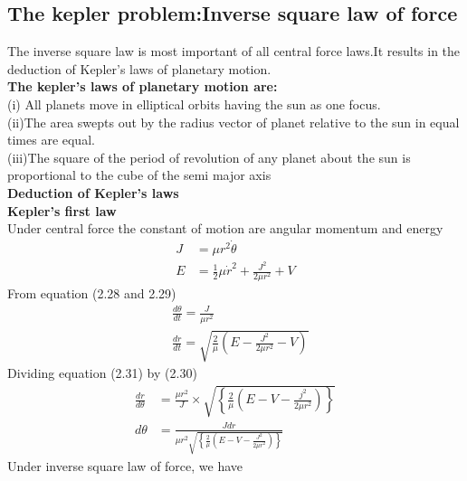 \subsection{The kepler problem:Inverse square law of force}
The inverse square law is most important of all central force laws.It results in the deduction of Kepler's laws of planetary motion.\\
\textbf{The kepler's laws of planetary motion are:}\\
(i) All planets move in elliptical orbits having the sun as one focus.\\
(ii)The area swepts out by the radius vector of planet relative to the sun in equal times are equal.\\
(iii)The square of the period of revolution of any planet about the sun is proportional to the cube of the semi major axis\\
\textbf{Deduction of Kepler's laws}\\
\textbf{Kepler's first law}\\
Under central force the constant of motion are angular momentum and energy
\begin{align}
J&=\mu r^{2} \dot{\theta} \\
 E&=\frac{1}{2} \mu \dot{r}^{2}+\frac{J^{2}}{2 \mu r^{2}}+V
\end{align}
From equation (2.28 and 2.29)\\
\begin{align}
	&\frac{d \theta}{d t}=\frac{J}{\mu r^{2}} \\
	&\frac{d r}{d t}=\sqrt{\frac{2}{\mu}\left(E-\frac{J^{2}}{2 \mu r^{2}}-V\right)}
\end{align}
Dividing equation (2.31) by (2.30)
\begin{align}
	\frac{dr}{d \theta} &=\frac{\mu r^{2}}{J} \times \sqrt{\left\{\frac{2}{\mu}\left(E-V-\frac{j^{2}}{2 \mu r^{2}}\right)\right\}} \\
	d \theta &=\frac{J d r}{\mu r^{2} \sqrt{\left\{\frac{2}{\mu}\left(E-V-\frac{J^{2}}{2 \mu r^{2}}\right)\right\}}}
\end{align}
Under inverse square law of force, we have

